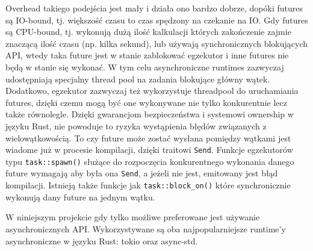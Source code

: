 Overhead takiego podejścia jest mały i działa ono bardzo dobrze, dopóki futures są IO-bound, tj.
większość czasu to czas spędzony na czekanie na IO. Gdy futures są CPU-bound, tj. wykonują dużą
ilość kalkulacji których zakończenie zajmie znaczącą ilość czasu (np. kilka sekund), lub używają
synchronicznych blokujących API, wtedy taka future jest w stanie zablokować egzekutor i inne futures
nie będą w stanie się wykonać. W tym celu asynchroniczne runtimes zazwyczaj udostępniają specjalny
thread pool na zadania blokujące główny wątek. Dodatkowo, egzekutor zazwyczaj też wykorzystuje
threadpool do uruchamiania futures, dzięki czemu mogą być one wykonywane nie tylko konkurentnie lecz
także równolegle. Dzięki gwarancjom bezpieczeństwa i systemowi ownership w języku Rust, nie powoduje
to ryzyka wystąpienia błędów związanych z wielowątkowością. To czy future może zostać wysłana
pomiędzy wątkami jest wiadome już w procesie kompilacji, dzięki traitowi \verb|Send|. Funkcje
egzekutorów typu \verb|task::spawn()| służące do rozpoczęcia konkurentnego wykonania danego future
wymagają aby była ona \verb|Send|, a jeżeli nie jest, emitowany jest błąd kompilacji. Istnieją także
funkcje jak \verb|task::block_on()| które synchronicznie wykonują dany future na jednym wątku.

W niniejszym projekcie gdy tylko możliwe preferowane jest używanie asynchronicznych API.
Wykorzystywane są oba najpopularniejsze runtime'y asynchroniczne w języku Rust: tokio oraz
async-std.

